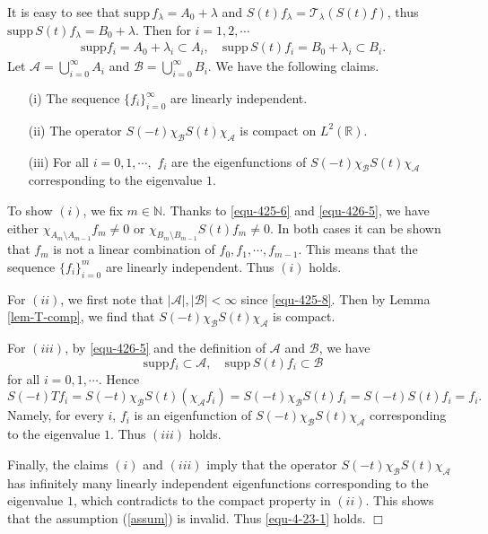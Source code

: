 \documentclass[preprint,12pt]{elsarticle}
\def\R {\mathbb{R}}
\begin{document}
It is easy to see that   $\mathrm{supp}\, f_\lambda=A_0+\lambda$ and $S(t)f_\lambda=\mathcal{T}_{\lambda}(S(t)f)$, thus  $\mathrm{supp}\,S(t)f_\lambda= B_0+\lambda$. Then for $i=1,2,\cdots$
\begin{align}\label{equ-426-5}
\mathrm{supp }f_i=A_0+\lambda_i\subset A_i, \quad \mathrm{supp}\,S(t)f_i =B_0+\lambda_i\subset B_i.
\end{align}
Let $\mathcal {A}=\bigcup_{i=0}^{\infty}A_i$ and $\mathcal {B}=\bigcup_{i=0}^{\infty}B_i$. We have the following claims.
\begin{itemize}
  \item [(i)] The sequence $\{ f_i\}_{i=0}^{\infty}$ are linearly independent.
  \item [(ii)]  The operator $S(-t)\chi_\mathcal {B}S(t)\chi_\mathcal {A}$ is compact on $L^2(\R)$.
  \item [(iii)]  For all $i=0,1,\cdots,$ $f_i$ are the eigenfunctions of $S(-t)\chi_\mathcal {B}S(t)\chi_\mathcal {A}$ corresponding to the eigenvalue $1$.
\end{itemize}

To show $(i)$, we fix $m\in \mathbb{N}$. Thanks to \eqref{equ-425-6} and \eqref{equ-426-5}, we have either $\chi_{A_m\setminus A_{m-1}}f_m\neq 0$ or $\chi_{B_m\setminus B_{m-1}}S(t)f_m\neq 0$. In both cases it can be shown that $f_m$ is not a linear combination of $f_0,f_1,\cdots,f_{m-1}$. This means that the sequence $\{f_i\}_{i=0}^{m}$ are linearly independent. Thus $(i)$ holds.

For $(ii)$, we first note that $|\mathcal {A}|,|\mathcal {B}|<\infty$ since \eqref{equ-425-8}. Then by Lemma \ref{lem-T-comp}, we find that $S(-t)\chi_\mathcal {B}S(t)\chi_\mathcal {A}$ is compact.

For $(iii)$,  by \eqref{equ-426-5} and the definition of $\mathcal {A}$ and $\mathcal {B}$, we have
$$
\mathrm{supp } f_i\subset \mathcal {A}, \quad \mathrm{supp }\,  S(t)f_i\subset \mathcal {B}
$$
for all $i=0,1,\cdots$. Hence
$$
S(-t)Tf_i=S(-t)\chi_{\mathcal {B}}S(t)(\chi_{\mathcal {A}}f_i)=S(-t)\chi_{\mathcal {B}}S(t)f_i=S(-t)S(t)f_i=f_i.
$$
Namely, for every $i$, $f_i$ is an eigenfunction of $S(-t)\chi_\mathcal {B}S(t)\chi_\mathcal {A}$ corresponding to the eigenvalue $1$. Thus $(iii)$ holds.

Finally, the claims $(i)$ and $(iii)$ imply that   the  operator $S(-t)\chi_\mathcal {B}S(t)\chi_\mathcal {A}$  has infinitely many linearly independent eigenfunctions corresponding to the eigenvalue $1$, which contradicts to the compact property in $(ii)$. This shows that the assumption  (\ref{assum}) is invalid. Thus \eqref{equ-4-23-1} holds. $\Box$
\end{document}
